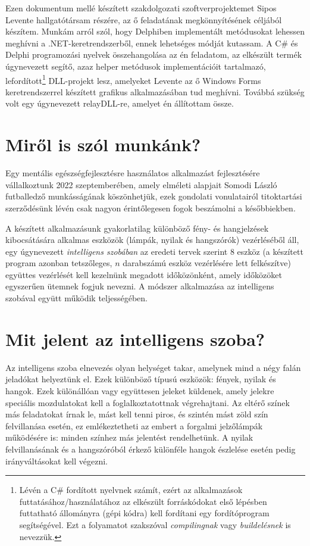 \documentclass[tocnopagenum]{thesis-ekf}
\begin{document}
	Ezen dokumentum mellé készített szakdolgozati szoftverprojektemet Sipos Levente hallgatótársam részére, az ő feladatának megkönnyítésének céljából készítem. 
	Munkám arról szól, hogy Delphiben implementált metódusokat lehessen meghívni a .NET-keretrendszerből, ennek lehetséges módját kutassam. A C\# és Delphi programozási nyelvek összehangolása az én feladatom, az elkészült termék úgynevezett segítő, azaz helper metódusok implementációit tartalmazó, lefordított\footnote{Lévén a C\# fordított nyelvnek számít, ezért az alkalmazások futtatásához/használatához az elkészült forráskódokat első lépésben futtatható állományra (gépi kódra) kell fordítani egy fordítóprogram segítségével. Ezt a folyamatot szakszóval \textit{compilingnak} vagy \textit{buildelésnek} is nevezzük.} DLL-projekt lesz, amelyeket Levente az ő Windows Forms keretrendszerrel készített grafikus alkalmazásában tud meghívni. Továbbá szükség volt egy úgynevezett relayDLL-re, amelyet én állítottam össze.
	
	\section{Miről is szól munkánk?}
	Egy mentális egészségfejlesztésre használatos alkalmazást fejlesztésére vállalkoztunk 2022 szeptemberében, amely elméleti alapjait Somodi László futballedző munkásságának köszönhetjük, ezek gondolati vonulatairól titoktartási szerződésünk lévén csak nagyon érintőlegesen fogok beszámolni a későbbiekben. 
	
	A készített alkalmazásunk gyakorlatilag különböző fény- és hangjelzések kibocsátására alkalmas eszközök (lámpák, nyilak és hangszórók) vezérléséből áll, egy úgynevezett \emph{intelligens szobában} az eredeti tervek szerint 8 eszköz (a készített program azonban tetszőleges, $n$ darabszámú eszköz vezérlésére lett felkészítve) együttes vezérlését kell kezelnünk megadott időközönként, amely időközöket egyszerűen ütemnek fogjuk nevezni.
	A módszer alkalmazása az intelligens szobával együtt működik teljességében.
	
	\section{Mit jelent az intelligens szoba?}
	Az intelligens szoba elnevezés olyan helységet takar, amelynek mind a négy falán jeladókat helyeztünk el.
	Ezek különböző típusú eszközök: fények, nyilak és hangok. 
	Ezek különállóan vagy együttesen jeleket küldenek, amely jelekre speciális mozdulatokat kell a foglalkoztatottnak végrehajtani.
	Az eltérő színek más feladatokat írnak le, mást kell tenni piros, és szintén mást zöld szín felvillanása esetén, ez emlékeztetheti az embert a forgalmi jelzőlámpák működésére is: minden színhez más jelentést rendelhetünk. A nyilak felvillanásának és a hangszóróból érkező különféle hangok észlelése esetén pedig irányváltásokat kell végezni.
	
\end{document}
